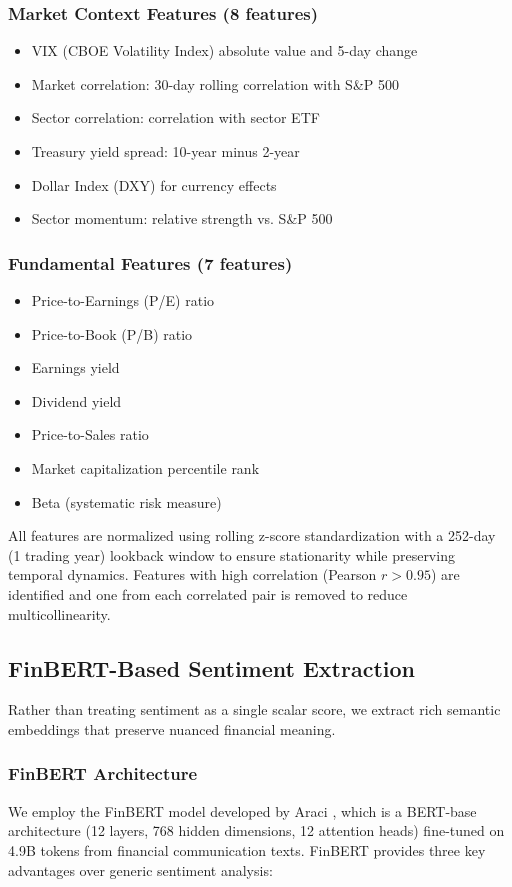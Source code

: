 \documentclass[conference]{IEEEtran}
\begin{document}
\subsubsection{Market Context Features (8 features)}
\begin{itemize}
\item VIX (CBOE Volatility Index) absolute value and 5-day change
\item Market correlation: 30-day rolling correlation with S\&P 500
\item Sector correlation: correlation with sector ETF
\item Treasury yield spread: 10-year minus 2-year
\item Dollar Index (DXY) for currency effects
\item Sector momentum: relative strength vs. S\&P 500
\end{itemize}

\subsubsection{Fundamental Features (7 features)}
\begin{itemize}
\item Price-to-Earnings (P/E) ratio
\item Price-to-Book (P/B) ratio
\item Earnings yield
\item Dividend yield
\item Price-to-Sales ratio
\item Market capitalization percentile rank
\item Beta (systematic risk measure)
\end{itemize}

All features are normalized using rolling z-score standardization with a 252-day (1 trading year) lookback window to ensure stationarity while preserving temporal dynamics. Features with high correlation (Pearson $r > 0.95$) are identified and one from each correlated pair is removed to reduce multicollinearity.

\subsection{FinBERT-Based Sentiment Extraction}

Rather than treating sentiment as a single scalar score, we extract rich semantic embeddings that preserve nuanced financial meaning.

\subsubsection{FinBERT Architecture}
We employ the FinBERT model developed by Araci \cite{araci2019finbert}, which is a BERT-base architecture (12 layers, 768 hidden dimensions, 12 attention heads) fine-tuned on 4.9B tokens from financial communication texts. FinBERT provides three key advantages over generic sentiment analysis:
\end{document}
